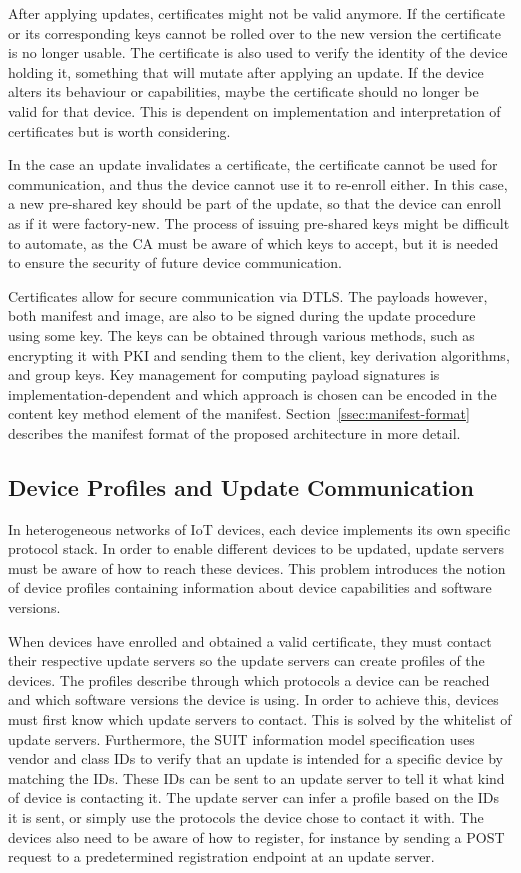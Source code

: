 \documentclass[0-thesis.tex]{subfiles}
\begin{document}
After applying updates, certificates might not be valid anymore. If the certificate or its
corresponding keys cannot be rolled over to the new version the certificate is no longer
usable. The certificate is also used to verify the identity of the device holding it,
something that will mutate after applying an update. If the device alters its behaviour or
capabilities, maybe the certificate should no longer be valid for that device. This is
dependent on implementation and interpretation of certificates but is worth considering.

In the case an update invalidates a certificate, the certificate cannot be used for
communication, and thus the device cannot use it to re-enroll either. In this case, a new
pre-shared key should be part of the update, so that the device can enroll as if it were
factory-new. The process of issuing pre-shared keys might be difficult to automate, as the
CA must be aware of which keys to accept, but it is needed to ensure the security of
future device communication.

Certificates allow for secure communication via DTLS. The payloads however, both manifest
and image, are also to be signed during the update procedure using some key. The keys can
be obtained through various methods, such as encrypting it with PKI and sending them to
the client, key derivation algorithms, and group keys. Key management for computing
payload signatures is implementation-dependent and which approach is chosen can be encoded
in the content key method element of the manifest. Section~\ref{ssec:manifest-format}
describes the manifest format of the proposed architecture in more detail.

\subsection{Device Profiles and Update Communication}
\label{ssec:communication}
In heterogeneous networks of IoT devices, each device implements its own specific protocol
stack. In order to enable different devices to be updated, update servers must be aware of
how to reach these devices. This problem introduces the notion of device profiles
containing information about device capabilities and software versions. 

When devices have enrolled and obtained a valid certificate, they must contact their
respective update servers so the update servers can create profiles of the devices. The
profiles describe through which protocols a device can be reached and which software
versions the device is using. In order to achieve this, devices must first know which
update servers to contact. This is solved by the whitelist of update servers. Furthermore,
the SUIT information model specification uses vendor and class IDs to verify that an
update is intended for a specific device by matching the IDs. These IDs can be sent to an
update server to tell it what kind of device is contacting it. The update server can infer
a profile based on the IDs it is sent, or simply use the protocols the device chose to
contact it with. The devices also need to be aware of how to register, for instance by
sending a  POST request to a predetermined registration endpoint at an update server. 
\end{document}
